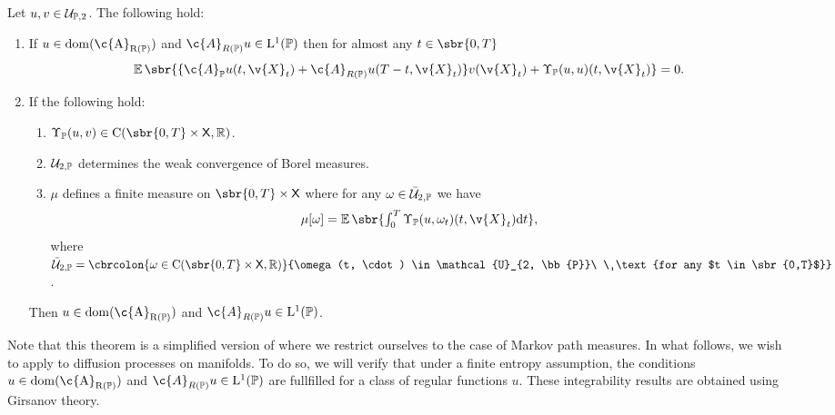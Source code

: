 \begin{theorem}
	\label{thm:ibp_cattiaux}
	Let $u, v \in \mathcal{U}_{\bb{P}, 2}$.
	The following hold: \begin{enumerate}[label= (\alph*), wide, labelindent=0pt] \item If $u \in \rm{dom}(\c{A}_{R(\bb{P})})$ and $\c{A}_{R(\bb{P})}u \in \mathrm{L}^1(\bb{P})$ then for almost any $t \in \sbr{0,T}$ \begin{equation} \E\sbr{\{\c{A}_{\bb{P}} u(t, \v{X}_t) + \c{A}_{R(\bb{P})} u (T-t, \v{X}_t)\}v(\v{X}_t) + \carrechamp_{\bb{P}}(u,u)(t, \v{X}_t)} = 0 .
		      \end{equation}
		\item If the following hold:
		      \begin{enumerate}[label=\roman*)]
			      \item $\carrechamp_{\bb{P}}(u,v) \in \mathrm{C}(\sbr{0,T} \times \sf{X}, \R)$.
			      \item $\mathcal{U}_{2, \bb{P}}$ determines the weak convergence of Borel measures.
			      \item $\mu$ defines a finite measure on $\sbr{0,T} \times \sf{X}$ where for
			            any $\omega \in \bar{\mathcal{U}}_{2, \bb{P}}$ we have
			            \begin{equation}
				            \textstyle{\mu[\omega] = \E\sbr{\int_0^T \carrechamp_{\bb{P}}(u,\omega_t)(t, \v{X}_t) \mathrm{d} t }},
			            \end{equation}
			            where
			            $\bar{\mathcal{U}}_{2, \bb{P}} = \cbrcolon{\omega \in \mathrm{C}(\sbr{0,T}
				            \times \sf{X}, \R)}{\omega(t, \cdot) \in \mathcal{U}_{2, \bb{P}}\ \
				            \text{for any $t \in \sbr{0,T}$}}$.
		      \end{enumerate}
		      Then $u \in \rm{dom}(\c{A}_{R(\bb{P})})$ and $\c{A}_{R(\bb{P})}u \in \mathrm{L}^1(\bb{P})$.
	\end{enumerate}
\end{theorem}

Note that this theorem is a simplified version of \textcite[Theorem 3.17]{cattiaux2021time} where we restrict ourselves to the case of Markov path measures.
In what follows, we wish to apply \Cref{thm:ibp_cattiaux} to diffusion processes on manifolds.
To do so, we will verify that under a finite entropy assumption, the conditions $u \in \rm{dom}(\c{A}_{R(\bb{P})})$ and $\c{A}_{R(\bb{P})}u \in \mathrm{L}^1(\bb{P})$ are fullfilled for a class of regular functions $u$.
These integrability results are obtained using Girsanov theory.

